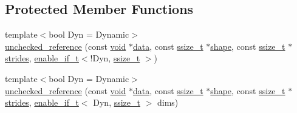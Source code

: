 \subsection*{Protected Member Functions}
\begin{DoxyCompactItemize}
\item 
{\footnotesize template$<$bool Dyn = Dynamic$>$ }\\\mbox{\hyperlink{classunchecked__reference_ae5522c90828ed6a7c58687e6969ef97c}{unchecked\+\_\+reference}} (const \mbox{\hyperlink{_s_d_l__opengles2__gl2ext_8h_ae5d8fa23ad07c48bb609509eae494c95}{void}} $\ast$\mbox{\hyperlink{_s_d_l__opengl_8h_a2e335d56e2846b0fea47eed068b2d34a}{data}}, const \mbox{\hyperlink{detail_2common_8h_ac430d16fc097b3bf0a7469cfd09decda}{ssize\+\_\+t}} $\ast$\mbox{\hyperlink{classunchecked__reference_a5065c039307f9797f8d4dc8f9e422d82}{shape}}, const \mbox{\hyperlink{detail_2common_8h_ac430d16fc097b3bf0a7469cfd09decda}{ssize\+\_\+t}} $\ast$\mbox{\hyperlink{_s_d_l__opengl__glext_8h_a0ee97b40d6208eba611c597d83b029a5}{strides}}, \mbox{\hyperlink{detail_2common_8h_a012819c9e8b5e04872a271f50f8b8196}{enable\+\_\+if\+\_\+t}}$<$!Dyn, \mbox{\hyperlink{detail_2common_8h_ac430d16fc097b3bf0a7469cfd09decda}{ssize\+\_\+t}} $>$)
\item 
{\footnotesize template$<$bool Dyn = Dynamic$>$ }\\\mbox{\hyperlink{classunchecked__reference_a6872fd3f36835f14b6e943aebdbc0ae4}{unchecked\+\_\+reference}} (const \mbox{\hyperlink{_s_d_l__opengles2__gl2ext_8h_ae5d8fa23ad07c48bb609509eae494c95}{void}} $\ast$\mbox{\hyperlink{_s_d_l__opengl_8h_a2e335d56e2846b0fea47eed068b2d34a}{data}}, const \mbox{\hyperlink{detail_2common_8h_ac430d16fc097b3bf0a7469cfd09decda}{ssize\+\_\+t}} $\ast$\mbox{\hyperlink{classunchecked__reference_a5065c039307f9797f8d4dc8f9e422d82}{shape}}, const \mbox{\hyperlink{detail_2common_8h_ac430d16fc097b3bf0a7469cfd09decda}{ssize\+\_\+t}} $\ast$\mbox{\hyperlink{_s_d_l__opengl__glext_8h_a0ee97b40d6208eba611c597d83b029a5}{strides}}, \mbox{\hyperlink{detail_2common_8h_a012819c9e8b5e04872a271f50f8b8196}{enable\+\_\+if\+\_\+t}}$<$ Dyn, \mbox{\hyperlink{detail_2common_8h_ac430d16fc097b3bf0a7469cfd09decda}{ssize\+\_\+t}} $>$ dims)
\end{DoxyCompactItemize}
